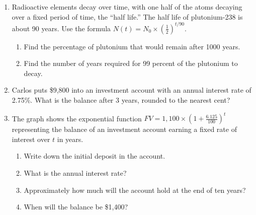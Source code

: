 \documentclass[12pt, twoside]{article}
\begin{document}
\begin{enumerate}
\begin{multicols}{2}
\begin{center}
    \end{center}
    \end{multicols}

\newpage
\subsubsection*{5.6 Exit Note: Simple interest rates}
\item Radioactive elements decay over time, with one half of the atoms decaying over a fixed period of time, the ``half life.'' The half life of plutonium-238 is about 90 years. Use the formula $\displaystyle N(t)=N_0 \times \left( \frac{1}{2} \right)^{t/90}$. 
\begin{enumerate}[itemsep=1.5cm]
    \item Find the percentage of plutonium that would remain after 1000 years.
    \item Find the number of years required for 99 percent of the plutonium to decay.
\end{enumerate}


\item Carlos puts \$9,800 into an investment account with an annual interest rate of 2.75\%. What is the balance after 3 years, rounded to the nearest cent? \vspace{2cm}

\item The graph shows the exponential function $\displaystyle FV=1,100 \times \left( 1+\frac{6.125}{100} \right)^t$ representing the balance of an investment account earning a fixed rate of interest over $t$ in years.
\begin{multicols}{2}
    \begin{enumerate}[itemsep=1cm]
        \item Write down the initial deposit in the account.
        \item What is the annual interest rate?
        \item Approximately how much will the account hold at the end of ten years?
        \item When will the balance be \$1,400?
    \end{enumerate}
    \begin{center}
\end{center}
\end{multicols}
\end{enumerate}
\end{document}
